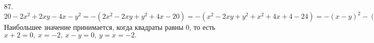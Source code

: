 87. $20-2x^2+2xy-4x-y^2=-(2x^2-2xy+y^2+4x-20)=-(x^2-2xy+y^2+x^2+4x+4-24)=-(x-y)^2-(x+2)^2+24.$ Наибольшее значение принимается, когда квадраты равны 0, то есть $x+2=0,\ x=-2,\ x-y=0,\ y=x=-2.$\\
